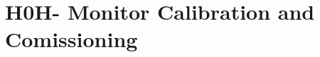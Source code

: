 \documentclass[12pt,twoside,openright]{report}
\begin{document}
%


%


\label{ch:Overview}
%

%
\label{ch:BeamInstrumentation}

\label{ch:BeamMatterInter}
%

\label{ch:CurrentModeling}
%

\label{ch:TempModeling}
%

\label{ch:ThermoMeasur}
%

\label{ch:EmissivityMeas}
%

\label{ch:ThermModelExamples}
%

\chapter{H0H- Monitor Calibration and Comissioning}
\label{ch:H0Hm}





\printbibliography 
\end{document}
